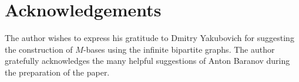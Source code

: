 \documentclass[12pt,oneside,a4paper]{amsart}
\begin{document}
  \section{Acknowledgements}
    The author wishes to express his gratitude to Dmitry Yakubovich for suggesting the construction of $M$-bases using the infinite bipartite graphs.
    The author gratefully acknowledges the many helpful suggestions of Anton Baranov during the preparation of the paper.

\end{document}
